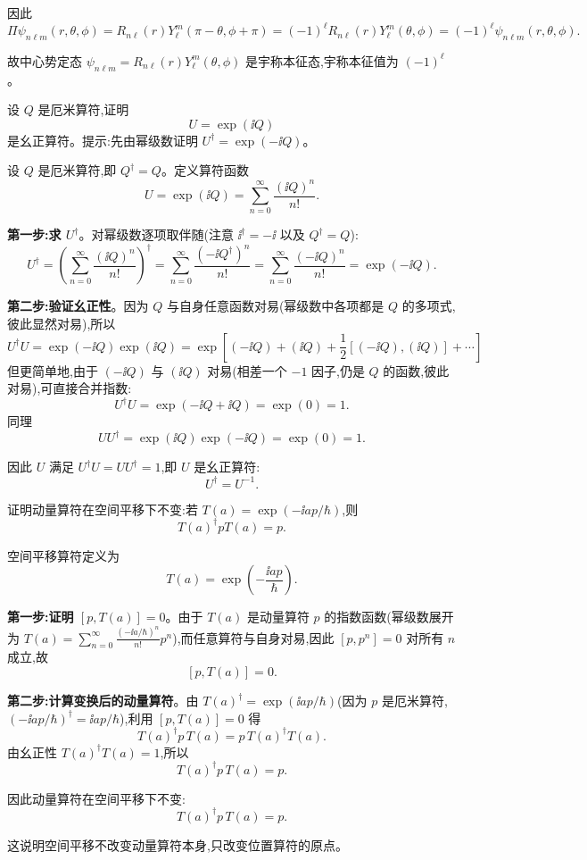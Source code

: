 \begin{question}
\begin{solution}
	因此
	\[
	\Pi\psi_{n\ell m}(r,\theta,\phi)=R_{n\ell}(r)Y_\ell^m(\pi-\theta,\phi+\pi)
	=(-1)^\ell R_{n\ell}(r)Y_\ell^m(\theta,\phi)=(-1)^\ell\psi_{n\ell m}(r,\theta,\phi).
	\]

	故中心势定态 $\psi_{n\ell m}=R_{n\ell}(r)Y_\ell^m(\theta,\phi)$ 是宇称本征态,宇称本征值为 $\boxed{(-1)^\ell}$。
	\end{solution}
\end{question}

\begin{question}
设 $Q$ 是厄米算符,证明
\[
U=\exp(\ii Q)
\]
是幺正算符。提示:先由幂级数证明 $U^\dagger=\exp(-\ii Q)$。
\begin{solution}
	设 $Q$ 是厄米算符,即 $Q^\dagger=Q$。定义算符函数
	\[
	U=\exp(\ii Q)=\sum_{n=0}^\infty\frac{(\ii Q)^n}{n!}.
	\]

	\textbf{第一步:求 $U^\dagger$}。对幂级数逐项取伴随(注意 $\ii^\dagger=-\ii$ 以及 $Q^\dagger=Q$):
	\[
	U^\dagger=\left(\sum_{n=0}^\infty\frac{(\ii Q)^n}{n!}\right)^\dagger
	=\sum_{n=0}^\infty\frac{(-\ii Q^\dagger)^n}{n!}
	=\sum_{n=0}^\infty\frac{(-\ii Q)^n}{n!}
	=\exp(-\ii Q).
	\]

	\textbf{第二步:验证幺正性}。因为 $Q$ 与自身任意函数对易(幂级数中各项都是 $Q$ 的多项式,彼此显然对易),所以
	\[
	U^\dagger U=\exp(-\ii Q)\exp(\ii Q)
	=\exp[(-\ii Q)+(\ii Q)+\frac12[(-\ii Q),(\ii Q)]+\cdots]
	\]
	但更简单地,由于 $(-\ii Q)$ 与 $(\ii Q)$ 对易(相差一个 $-1$ 因子,仍是 $Q$ 的函数,彼此对易),可直接合并指数:
	\[
	U^\dagger U = \exp(-\ii Q + \ii Q) = \exp(0) = 1.
	\]
	同理
	\[
	UU^\dagger = \exp(\ii Q)\exp(-\ii Q) = \exp(0) = 1.
	\]

	因此 $U$ 满足 $U^\dagger U = UU^\dagger = 1$,即 $U$ 是幺正算符:
	\[
	\boxed{U^\dagger = U^{-1}}.
	\]
	\end{solution}
\end{question}

\begin{question}
证明动量算符在空间平移下不变:若 $T(a)=\exp(-\ii ap/\hbar)$,则
\[
T(a)^\dagger pT(a)=p.
\]
\begin{solution}
	空间平移算符定义为
	\[
	T(a)=\exp\!\left(-\frac{\ii a p}{\hbar}\right).
	\]

	\textbf{第一步:证明 $[p,T(a)]=0$}。由于 $T(a)$ 是动量算符 $p$ 的指数函数(幂级数展开为 $T(a)=\sum_{n=0}^\infty\frac{(-\ii a/\hbar)^n}{n!}p^n$),而任意算符与自身对易,因此 $[p,p^n]=0$ 对所有 $n$ 成立,故
	\[
	[p,T(a)]=0.
	\]

	\textbf{第二步:计算变换后的动量算符}。由 $T(a)^\dagger=\exp(\ii a p/\hbar)$(因为 $p$ 是厄米算符,$(-\ii a p/\hbar)^\dagger=\ii a p/\hbar$),利用 $[p,T(a)]=0$ 得
	\[
	T(a)^\dagger p\,T(a) = p\,T(a)^\dagger T(a).
	\]
	由幺正性 $T(a)^\dagger T(a)=1$,所以
	\[
	T(a)^\dagger p\,T(a) = p.
	\]

	因此动量算符在空间平移下不变:
	\[
	\boxed{T(a)^\dagger p\,T(a)=p}.
	\]

	这说明空间平移不改变动量算符本身,只改变位置算符的原点。
	\end{solution}
\end{question}

